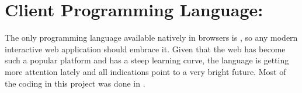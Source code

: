 \section{Client Programming Language: } %
\label{sec:javascript}

The only programming language available natively in browsers is , so any modern interactive web application should embrace it.
Given that the web has become such a popular platform and  has a steep learning curve, the language is getting more attention lately and all indications point to a very bright future.
Most of the coding in this project was done in .






